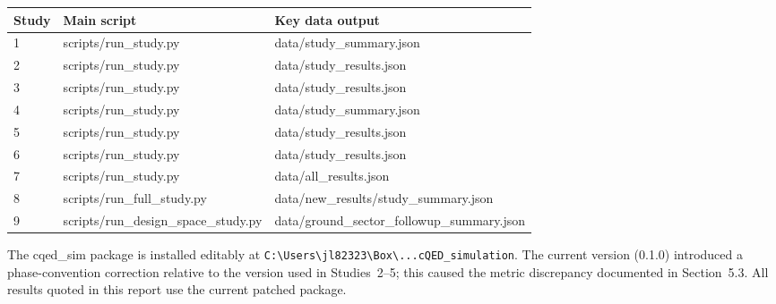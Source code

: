 \documentclass[11pt,letterpaper]{article}
\begin{document}
\begin{center}
\begin{tabular}{lll}
\toprule
Study & Main script & Key data output \\
\midrule
1 & scripts/run\_study.py & data/study\_summary.json \\
2 & scripts/run\_study.py & data/study\_results.json \\
3 & scripts/run\_study.py & data/study\_results.json \\
4 & scripts/run\_study.py & data/study\_summary.json \\
5 & scripts/run\_study.py & data/study\_results.json \\
6 & scripts/run\_study.py & data/study\_results.json \\
7 & scripts/run\_study.py & data/all\_results.json \\
8 & scripts/run\_full\_study.py & data/new\_results/study\_summary.json \\
9 & scripts/run\_design\_space\_study.py & data/ground\_sector\_followup\_summary.json \\
\bottomrule
\end{tabular}
\end{center}

\noindent The cqed\_sim package is installed editably at
\texttt{C:\textbackslash{}Users\textbackslash{}jl82323\textbackslash{}Box\textbackslash{}...cQED\_simulation}.
The current version (0.1.0) introduced a phase-convention correction relative to the
version used in Studies~2--5; this caused the metric discrepancy documented in Section~5.3.
All results quoted in this report use the current patched package.
\end{document}
